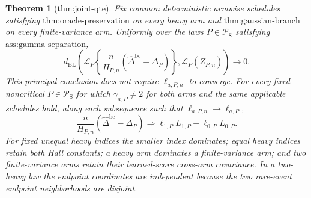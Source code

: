 \documentclass{article}
\newtheorem{theorem}{Theorem}
\begin{document}
\begin{theorem}[thm:joint-qte]\label{thm:joint-qte}
Fix common deterministic armwise schedules satisfying \(\text{thm:oracle-preservation}\) on every heavy arm and \(\text{thm:gaussian-branch}\) on every finite-variance arm.  Uniformly over the laws \(P\in\mathcal P_{\mathrm S}\) satisfying \(\text{ass:gamma-separation}\),
\[
d_{\mathrm{BL}}\!\left(
\mathcal L_P\!\left\{\frac n{H_{P,n}}
(\widehat\Delta^{\mathrm{bc}}-\Delta_P)\right\},
\mathcal L_P(Z_{P,n})\right)\longrightarrow0.
\]
This principal conclusion does not require \(\ell_{a,P,n}\) to converge.  For every fixed noncritical \(P\in\mathcal P_{\mathrm S}\) for which \(\gamma_{a,P}\ne2\) for both arms and the same applicable schedules hold, along each subsequence such that \(\ell_{a,P,n}\to\ell_{a,P}\),
\[
\frac n{H_{P,n}}(\widehat\Delta^{\mathrm{bc}}-\Delta_P)
\Rightarrow \ell_{1,P}L_{1,P}-\ell_{0,P}L_{0,P}.
\]
For fixed unequal heavy indices the smaller index dominates; equal heavy indices retain both Hall constants; a heavy arm dominates a finite-variance arm; and two finite-variance arms retain their learned-score cross-arm covariance.  In a two-heavy law the endpoint coordinates are independent because the two rare-event endpoint neighborhoods are disjoint.
\end{theorem}
\end{document}
